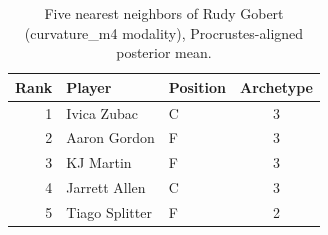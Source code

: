 \begin{table}[htbp]
  \centering\small
  \begin{tabular}{rllc}
    \toprule
    Rank & Player & Position & Archetype \\
    \midrule
    1 & Ivica Zubac & C & 3 \\
    2 & Aaron Gordon & F & 3 \\
    3 & KJ Martin & F & 3 \\
    4 & Jarrett Allen & C & 3 \\
    5 & Tiago Splitter & F & 2 \\
    \bottomrule
  \end{tabular}
  \caption{Five nearest neighbors of Rudy Gobert (curvature_m4 modality), Procrustes-aligned posterior mean.}
  \label{tab:Rudy_Gobert_neighbors_curvature_m4}
\end{table}

